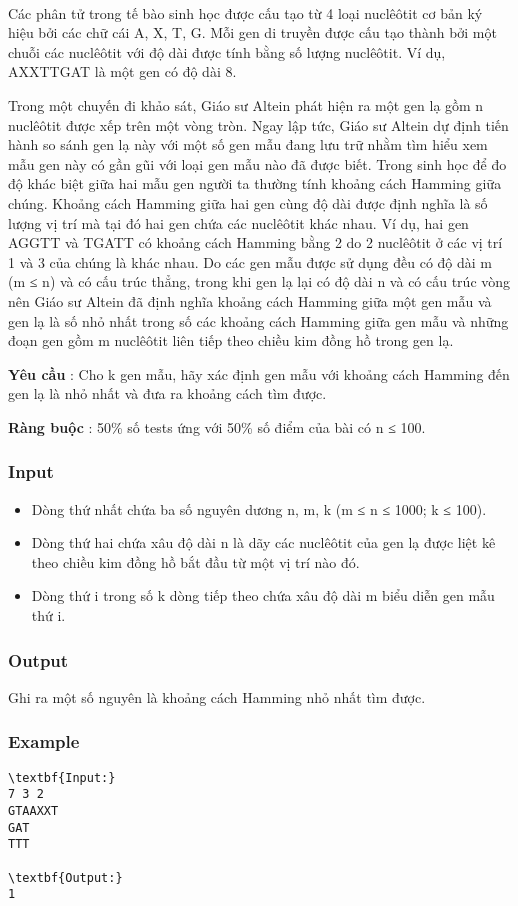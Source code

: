 

 

Các phân tử trong tế bào sinh học được cấu tạo từ 4 loại nuclêôtit cơ bản ký hiệu bởi các chữ cái A, X, T, G. Mỗi gen di truyền được cấu tạo thành bởi một chuỗi các nuclêôtit với độ dài được tính bằng số lượng nuclêôtit. Ví dụ, AXXTTGAT là một gen có độ dài 8.





Trong một chuyến đi khảo sát, Giáo sư Altein phát hiện ra một gen lạ gồm n nuclêôtit được xếp trên một vòng tròn. Ngay lập tức, Giáo sư Altein dự định tiến hành so sánh gen lạ này với một số gen mẫu đang lưu trữ nhằm tìm hiểu xem mẫu gen này có gần gũi với loại gen mẫu nào đã được biết. Trong sinh học để đo độ khác biệt giữa hai mẫu gen người ta thường tính khoảng cách Hamming giữa chúng. Khoảng cách Hamming giữa hai gen cùng độ dài được định nghĩa là số lượng vị trí mà tại đó hai gen chứa các nuclêôtit khác nhau. Ví dụ, hai gen AGGTT và TGATT có khoảng cách Hamming bằng 2 do 2 nuclêôtit ở các vị trí 1 và 3 của chúng là khác nhau. Do các gen mẫu được sử dụng đều có độ dài m (m ≤ n) và có cấu trúc thẳng, trong khi gen lạ lại có độ dài n và có cấu trúc vòng nên Giáo sư Altein đã định nghĩa khoảng cách Hamming giữa một gen mẫu và gen lạ là số nhỏ nhất trong số các khoảng cách Hamming giữa gen mẫu và những đoạn gen gồm m nuclêôtit liên tiếp theo chiều kim đồng hồ trong gen lạ.





\textbf{Yêu cầu } : Cho k gen mẫu, hãy xác định gen mẫu với khoảng cách Hamming đến gen lạ là nhỏ nhất và đưa ra khoảng cách tìm được.

\textbf{Ràng buộc } : 50\% số tests ứng với 50\% số điểm của bài có n ≤ 100.

\subsubsection{Input}
\begin{itemize}
	\item Dòng thứ nhất chứa ba số nguyên dương n, m, k (m ≤ n ≤ 1000; k ≤ 100).
	\item Dòng thứ hai chứa xâu độ dài n là dãy các nuclêôtit của gen lạ được liệt kê theo chiều kim đồng hồ bắt đầu từ một vị trí nào đó.
	\item Dòng thứ i trong số k dòng tiếp theo chứa xâu độ dài m biểu diễn gen mẫu thứ i.
\end{itemize}

\subsubsection{Output}

Ghi ra một số nguyên là khoảng cách Hamming nhỏ nhất tìm được.

\subsubsection{Example}
\begin{verbatim}
\textbf{Input:}
7 3 2
GTAAXXT
GAT
TTT

\textbf{Output:}
1
\end{verbatim}
